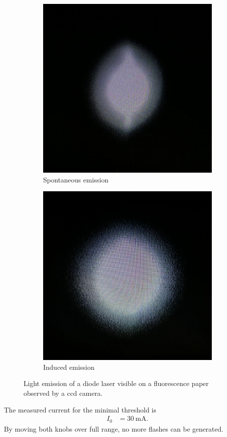 \begin{figure}[h]
		\centering
		\begin{subfigure}[b]{0.45\textwidth}
				\begin{center}
						\includegraphics[width=0.7\linewidth]{./content/pictures/below_threshold.jpg}
						\caption{Spontaneous emission}
				\label{fig:spontanious}
				\end{center}
		\end{subfigure}
		\begin{subfigure}[b]{0.45\textwidth}
				\begin{center}
						\includegraphics[width=0.7\linewidth]{./content/pictures/above_threshold.jpg}
						\caption{Induced emission}
						\label{fig:induce}
				\end{center}
		\end{subfigure}
		\caption{Light emission of a diode laser visible on a fluorescence
		paper observed by a ccd camera.}
		\label{fig:emission}
\end{figure}
The measured current for the minimal threshold is
\begin{align}
  I_0 &= \SI{30}{\milli\ampere}.
\end{align}
By moving both knobs over full range, no more flashes can be generated.

